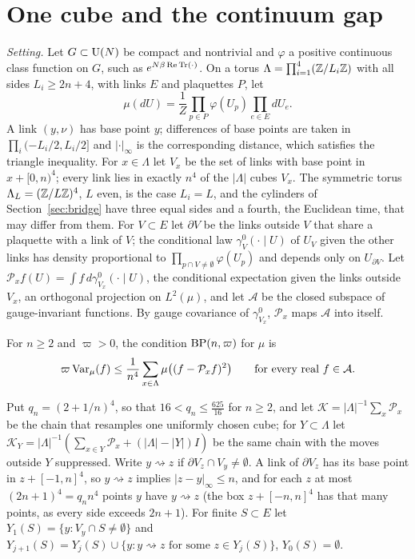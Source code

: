 \section{One cube and the continuum gap}\label{sec:cube}

\emph{Setting.} Let $G\subset\mathrm{U}(N)$ be compact and nontrivial and $\varphi$ a
positive continuous class function on $G$, such as $e^{N\beta\operatorname{Re}\operatorname{Tr}(\cdot)}$. On
a torus $\Lambda=\prod_{i=1}^4(\mathbb{Z}/L_i\mathbb{Z})$ with all sides $L_i\ge2n+4$, with
links $E$ and plaquettes $P$, let
\[
\mu(dU)=\frac1Z\prod_{p\in P}\varphi(U_p)\prod_{e\in E}dU_e .
\]
A link $(y,\nu)$ has base point $y$; differences of base points are taken in
$\prod_i(-L_i/2,L_i/2]$ and $|\cdot|_\infty$ is the corresponding distance,
which satisfies the triangle inequality. For $x\in\Lambda$ let $V_x$ be the set
of links with base point in $x+[0,n)^4$; every link lies in exactly $n^4$ of the
$|\Lambda|$ cubes $V_x$. The symmetric torus $\Lambda_L=(\mathbb{Z}/L\mathbb{Z})^4$, $L$ even, is
the case $L_i=L$, and the cylinders of Section~\ref{sec:bridge} have three equal
sides and a fourth, the Euclidean time, that may differ from them. For $V\subset E$ let
$\partial V$ be the links outside $V$ that share a plaquette with a link of
$V$; the conditional law $\gamma^0_V(\cdot\mid U)$ of $U_V$ given the other links
has density proportional to $\prod_{p\cap V\ne\emptyset}\varphi(U_p)$ and depends
only on $U_{\partial V}$. Let $\mathcal P_xf(U)=\int f\,d\gamma^0_{V_x}(\cdot\mid U)$,
the conditional expectation given the links outside $V_x$, an orthogonal
projection on $L^2(\mu)$, and let $\mathcal A$ be the closed subspace of
gauge-invariant functions. By gauge covariance of $\gamma^0_{V_x}$, $\mathcal P_x$
maps $\mathcal A$ into itself.

\begin{definition}\label{def:bp}
For $n\ge2$ and $\varpi>0$, the condition $\mathrm{BP}(n,\varpi)$ for $\mu$ is
\[
\varpi\operatorname{Var}_\mu(f)\le\frac1{n^4}\sum_{x\in\Lambda}\mu\bigl((f-\mathcal P_xf)^2\bigr)
\qquad\text{for every real }f\in\mathcal A .
\]
\end{definition}

Put $q_n=(2+1/n)^4$, so that $16<q_n\le\frac{625}{16}$ for $n\ge2$, and let
$\mathcal K=|\Lambda|^{-1}\sum_x\mathcal P_x$ be the chain that resamples one
uniformly chosen cube; for $Y\subset\Lambda$ let $\mathcal K_Y=|\Lambda|^{-1}
(\sum_{x\in Y}\mathcal P_x+(|\Lambda|-|Y|)I)$ be the same chain with the moves
outside $Y$ suppressed. Write
$y\rightsquigarrow z$ if $\partial V_z\cap V_y\ne\emptyset$. A link of $\partial
V_z$ has its base point in $z+[-1,n]^4$, so $y\rightsquigarrow z$ implies
$|z-y|_\infty\le n$, and for each $z$ at most $(2n+1)^4=q_nn^4$ points $y$ have
$y\rightsquigarrow z$ (the box $z+[-n,n]^4$ has that many points, as every side
exceeds $2n+1$). For finite $S\subset E$ let $Y_1(S)=\{y:V_y\cap S\ne
\emptyset\}$ and $Y_{j+1}(S)=Y_j(S)\cup\{y:y\rightsquigarrow z\text{ for some }
z\in Y_j(S)\}$, $Y_0(S)=\emptyset$.

